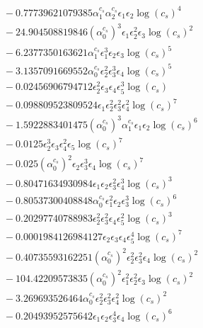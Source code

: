 \documentclass[10pt]{article}
\begin{document}
\begin{align*}
&{}  - 0.77739621079385 \alpha_{1}^{c_s} \alpha_{2}^{c_s} \epsilon_{1} \epsilon_{2} \log{\left(c_{s} \right)}^{4} \\
&{}  - 24.904508819846 \left(\alpha_{0}^{c_s}\right)^{3} \epsilon_{1} \epsilon_{2}^{2} \epsilon_{3} \log{\left(c_{s} \right)}^{2} \\
&{}  - 6.2377350163621 \alpha_{1}^{c_s} \epsilon_{1}^{3} \epsilon_{2} \epsilon_{3} \log{\left(c_{s} \right)}^{5} \\
&{}  - 3.1357091669552 \alpha_{0}^{c_s} \epsilon_{2}^{2} \epsilon_{3}^{3} \epsilon_{4} \log{\left(c_{s} \right)}^{5} \\
&{}  - 0.02456906794712 \epsilon_{2}^{2} \epsilon_{3} \epsilon_{4} \epsilon_{5}^{3} \log{\left(c_{s} \right)} \\
&{}  - 0.098809523809524 \epsilon_{1} \epsilon_{2}^{2} \epsilon_{3}^{2} \epsilon_{4}^{2} \log{\left(c_{s} \right)}^{7} \\
&{}  - 1.5922883401475 \left(\alpha_{0}^{c_s}\right)^{3} \alpha_{1}^{c_s} \epsilon_{1} \epsilon_{2} \log{\left(c_{s} \right)}^{6} \\
&{}  - 0.0125 \epsilon_{2}^{3} \epsilon_{3} \epsilon_{4}^{2} \epsilon_{5} \log{\left(c_{s} \right)}^{7} \\
&{}  - 0.025 \left(\alpha_{0}^{c_s}\right)^{2} \epsilon_{2} \epsilon_{3}^{3} \epsilon_{4} \log{\left(c_{s} \right)}^{7} \\
&{}  - 0.80471634930984 \epsilon_{1} \epsilon_{2} \epsilon_{3}^{2} \epsilon_{4}^{3} \log{\left(c_{s} \right)}^{3} \\
&{}  - 0.80537300408848 \alpha_{0}^{c_s} \epsilon_{1}^{2} \epsilon_{2} \epsilon_{3}^{3} \log{\left(c_{s} \right)}^{6} \\
&{}  - 0.20297740788983 \epsilon_{2}^{2} \epsilon_{3}^{2} \epsilon_{4} \epsilon_{5}^{2} \log{\left(c_{s} \right)}^{3} \\
&{}  - 0.0001984126984127 \epsilon_{2} \epsilon_{3} \epsilon_{4} \epsilon_{5}^{4} \log{\left(c_{s} \right)}^{7} \\
&{}  - 0.40735593162251 \left(\alpha_{0}^{c_s}\right)^{2} \epsilon_{2}^{2} \epsilon_{3}^{2} \epsilon_{4} \log{\left(c_{s} \right)}^{2} \\
&{}  - 104.42209573835 \left(\alpha_{0}^{c_s}\right)^{2} \epsilon_{1}^{2} \epsilon_{2}^{2} \epsilon_{3} \log{\left(c_{s} \right)}^{2} \\
&{}  - 3.269693526464 \alpha_{0}^{c_s} \epsilon_{2}^{2} \epsilon_{3}^{2} \epsilon_{4}^{2} \log{\left(c_{s} \right)}^{2} \\
&{}  - 0.20493952575642 \epsilon_{1} \epsilon_{2} \epsilon_{3}^{4} \epsilon_{4} \log{\left(c_{s} \right)}^{6} \\

\end{align*}
\end{document}
